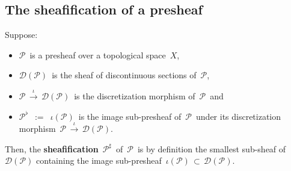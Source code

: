 
\vskip 1.0cm
\subsection{The sheafification of a presheaf}
\setcounter{theorem}{0}
\setcounter{equation}{0}

\begin{definition}
\mbox{}\vskip 0.1cm
\noindent
Suppose:
\begin{itemize}
\item
	$\mathscr{P}$\, is a presheaf over a topological space \,$X$,
\item
	$\mathscr{D}(\mathscr{P})$\, is the sheaf of discontinuous sections of \,$\mathscr{P}$,\,
\item
	$\mathscr{P}\,\overset{\iota}{\longrightarrow}\,\mathscr{D}(\mathscr{P})$\,
	is the discretization morphism of \,$\mathscr{P}$\, and
\item
	$\mathscr{P}^{\flat}$ \,$:=$\, $\iota(\mathscr{P})$\, is the image sub-presheaf of \,$\mathscr{P}$\,
	under its discretization morphism
	\,$\mathscr{P}\,\overset{\iota}{\longrightarrow}\,\mathscr{D}(\mathscr{P})$.\,
\end{itemize}
Then, the \textbf{sheafification} \,$\mathscr{P}^{\sharp}$\, of \,$\mathscr{P}$\,
is by definition the smallest sub-sheaf of $\mathscr{D}(\mathscr{P})$
containing the image sub-presheaf \,$\iota(\mathscr{P}) \,\subset\, \mathscr{D}(\mathscr{P})$.\,
\end{definition}


